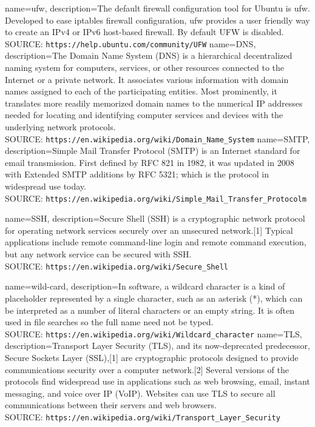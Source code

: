 
{
	name=ufw,
	description={The default firewall configuration tool for Ubuntu is ufw. Developed to ease iptables firewall configuration, ufw provides a user friendly way to create an IPv4 or IPv6 host-based firewall. By default UFW is disabled.\\SOURCE: \texttt{https://help.ubuntu.com/community/UFW}}
}
{
	name=DNS,
	description={The Domain Name System (DNS) is a hierarchical decentralized naming system for computers, services, or other resources connected to the Internet or a private network. It associates various information with domain names assigned to each of the participating entities. Most prominently, it translates more readily memorized domain names to the numerical IP addresses needed for locating and identifying computer services and devices with the underlying network protocols.\\SOURCE: \texttt{https://en.wikipedia.org/wiki/Domain\_Name\_System}}
}
{
	name=SMTP,
	description={Simple Mail Transfer Protocol (SMTP) is an Internet standard for email transmission. First defined by RFC 821 in 1982, it was updated in 2008 with Extended SMTP additions by RFC 5321; which is the protocol in widespread use today.\\SOURCE: \texttt{https://en.wikipedia.org/wiki/Simple\_Mail\_Transfer\_Protocolm}}
}

{
	name=SSH,
	description={Secure Shell (SSH) is a cryptographic network protocol for operating network services securely over an unsecured network.[1] Typical applications include remote command-line login and remote command execution, but any network service can be secured with SSH. \\SOURCE: \texttt{https://en.wikipedia.org/wiki/Secure\_Shell}}
}

{
	name=wild-card,
	description={In software, a wildcard character is a kind of placeholder represented by a single character, such as an asterisk (*), which can be interpreted as a number of literal characters or an empty string. It is often used in file searches so the full name need not be typed. \\SOURCE: \texttt{https://en.wikipedia.org/wiki/Wildcard\_character}}
}
{
	name=TLS,
	description={Transport Layer Security (TLS), and its now-deprecated predecessor, Secure Sockets Layer (SSL),[1] are cryptographic protocols designed to provide communications security over a computer network.[2] Several versions of the protocols find widespread use in applications such as web browsing, email, instant messaging, and voice over IP (VoIP). Websites can use TLS to secure all communications between their servers and web browsers. \\SOURCE: \texttt{https://en.wikipedia.org/wiki/Transport\_Layer\_Security}}
}

